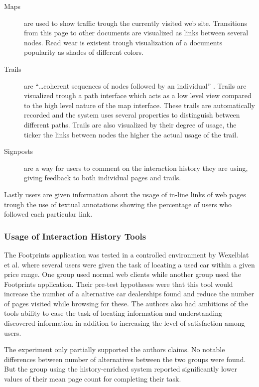 \documentclass[12pt,a4paper]{article}
\begin{document}
\begin{description}
  \item[Maps] are used to show traffic trough the currently visited
    web site. Transitions from this page to other documents are visualized as
    links between several nodes. Read wear is existent trough visualization of
    a documents popularity as shades of different colors.
  \item[Trails] are ``\ldots coherent sequences of nodes followed by an
    individual'' \cite{wexelblat99}. Trails are visualized trough a path
    interface which acts as a low level view compared to the high level nature
    of the map interface. These trails are automatically recorded and the
    system uses several properties to distinguish between different paths.
    Trails are also visualized by their degree of usage, the ticker the links
    between nodes the higher the actual usage of the trail.
  \item[Signposts] are a way for users to comment on the interaction history
    they are using, giving feedback to both individual pages and trails.
\end{description}

Lastly users are given information about the usage of in-line links of web
pages trough the use of textual annotations showing the percentage of users
who followed each particular link.

\subsubsection{Usage of Interaction History Tools}

The Footprints application was tested in a controlled environment by
Wexelblat et al. where several users were given the task of locating a used
car within a given price range. One group used normal web clients while
another group used the Footprints application.
Their pre-test hypotheses were that this tool
would increase the number of a alternative car dealerships found and reduce
the number of pages visited while browsing for these. The authors also had
ambitions of the tools ability to ease the task of locating
information and understanding discovered information in addition to
increasing the level of satisfaction among users.

The experiment only partially supported the authors claims. No notable
differences between number of alternatives between the two groups were found.
But the group using the history-enriched system reported significantly lower
values of their mean page count for completing their task.
\end{document}
